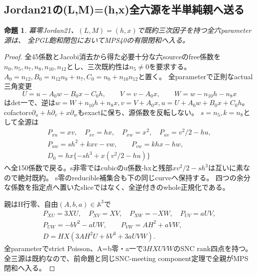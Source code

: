 \documentclass[a4paper,11pt]{ltjsarticle}
\newtheorem{proposition}{命題}[section]
\theoremstyle{definition}
\begin{document}
\subsection{Jordan21の(L,M)=(h,x)全六源を半単純親へ送る}
\begin{proposition}\label{prop:two-hyperplanes-j21-hx-all-MPS}
冪零Jordan21、$(L,M)=(h,x)$で既約三次因子を持つ全六parameter源は、
全PGL飽和閉包においてMPS40の有限閉和へ入る。
\end{proposition}
\begin{proof}
全45係数とJacobi消去から得た必要十分な六sourceのfree係数を
$n_0,n_5,n_7,n_8,n_{10},n_{12}$とし、三次既約性は$n_5\ne0$を要求する。
$A_0=n_{12},B_0=n_{12}n_8+n_7,C_0=n_0+n_{10}n_{12}$と置く。
全parameterで正則なactual三角変更
\[
 U=u-A_0w-B_0x-C_0h,\qquad V=v-A_0x,\qquad W=w-n_{10}h-n_8x
\]
はdet一で、逆は$w=W+n_{10}h+n_8x,v=V+A_0x,u=U+A_0w+B_0x+C_0h$。
cofactor$v\partial_u+h\partial_v+x\partial_w$もexactに保ち、源係数を反転しない。
$s=n_5,k=n_8$として全源は
\[
\begin{gathered}
 P_{xu}=xv,\quad P_{xv}=hx,\quad P_{xw}=x^2,\quad P_{uv}=v^2/2-hu,\\
 P_{uw}=sh^2+kxv-vw,\qquad P_{vw}=khx-hw,\\
 D_0=hx\{-sh^3+x(v^2/2-hu)\}
\end{gathered}
\]
へ全150係数で戻る。s非零ではcubicのu係数-hxと残部$xv^2/2-sh^3$は互いに素なので絶対既約。
s零のreducible補集合も下の同じcurveへ保持する。
四つの余分な係数を指定点へ置いたsliceではなく、全逆付きのwhole正規化である。

親はH行零、自由$(A,b,a)\in\mathbb A^3$で
\[
\begin{gathered}
 P_{XU}=3XU,\quad P_{XV}=XV,\quad P_{XW}=-XW,\quad P_{UV}=aUV,\\
 P_{UW}=-bV^2-aUW,\qquad P_{VW}=AH^2+aVW,\\
 D=HX(3AH^2U+bV^3+3aUVW).
\end{gathered}
\]
全parameterでstrict Poisson、A=b零・a一で$3HXUVW$のSNC rank四点を持つ。
全三源は既約なので、前命題と同じSNC-meeting component定理で全親がMPS閉和へ入る。


\end{proof}
\end{document}
